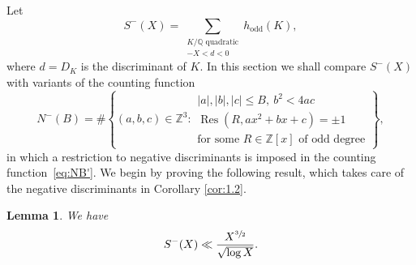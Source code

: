 \documentclass[JEP,XML,SOM,Unicode]{cedram}
\DeclareMathOperator{\Res}{Res}
\newcommand{\QQ}{\mathbb{Q}}\let\Q\QQ
\newcommand{\ZZ}{\mathbb{Z}}\let\Z\ZZ
\newtheorem{lemma}[theorem]{Lemma}
\begin{document}
Let
\[
S^-(X)=
\sum_{
\substack{K/\QQ \text{ quadratic}\\
-X<d<0
}} h_\text{odd}(K),
\]
where $d=D_K$ is the discriminant of $K$.
In this section we shall compare
$S^-(X)$ with variants of the counting function
\begin{equation}\label{eq:NB-}
N^-(B)=\#\left\{(a,b,c)\in \ZZ^3:
\begin{array}{l}
|a|,|b|,|c|\leq B, ~b^2<4ac\\
\Res(R,ax^2+bx+c)=\pm 1\\
\text{for some $R\in \ZZ[x]$ of odd degree}
\end{array}
\right\}\!,
\end{equation}
in which a restriction to negative discriminants is imposed in the counting function~\eqref{eq:NB'}.
We begin by proving the following result, which takes care of the negative discriminants in Corollary
\ref{cor:1.2}.

\begin{lemma}\label{lem:plant}
We have
\[
S^-(X)\ll \frac{X^{\sfrac{3}{2}}}{\sqrt{\log X}}.
\]
\end{lemma}
\end{document}
